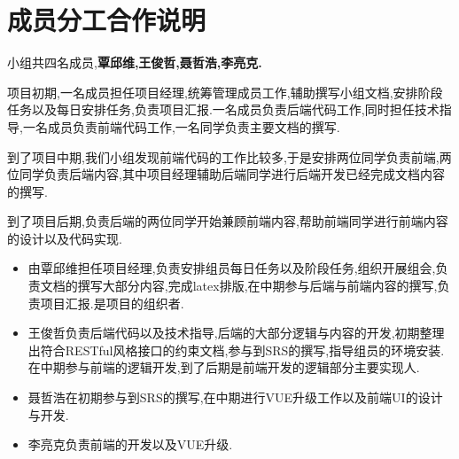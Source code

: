 \chapter{成员分工合作说明}

小组共四名成员,\textbf{覃邱维,王俊哲,聂哲浩,李亮克.}

项目初期,一名成员担任项目经理,统筹管理成员工作,辅助撰写小组文档,安排阶段任务以及每日安排任务,负责项目汇报.一名成员负责后端代码工作,同时担任技术指导,一名成员负责前端代码工作,一名同学负责主要文档的撰写.

到了项目中期,我们小组发现前端代码的工作比较多,于是安排两位同学负责前端,两位同学负责后端内容,其中项目经理辅助后端同学进行后端开发已经完成文档内容的撰写.

到了项目后期,负责后端的两位同学开始兼顾前端内容,帮助前端同学进行前端内容的设计以及代码实现.

\begin{itemize}
    \item 由覃邱维担任项目经理,负责安排组员每日任务以及阶段任务,组织开展组会,负责文档的撰写大部分内容,完成latex排版,在中期参与后端与前端内容的撰写,负责项目汇报.是项目的组织者.

    \item 王俊哲负责后端代码以及技术指导,后端的大部分逻辑与内容的开发,初期整理出符合RESTful风格接口的约束文档,参与到SRS的撰写,指导组员的环境安装.在中期参与前端的逻辑开发,到了后期是前端开发的逻辑部分主要实现人.
    \item 聂哲浩在初期参与到SRS的撰写,在中期进行VUE升级工作以及前端UI的设计与开发.
    \item 李亮克负责前端的开发以及VUE升级.
\end{itemize}